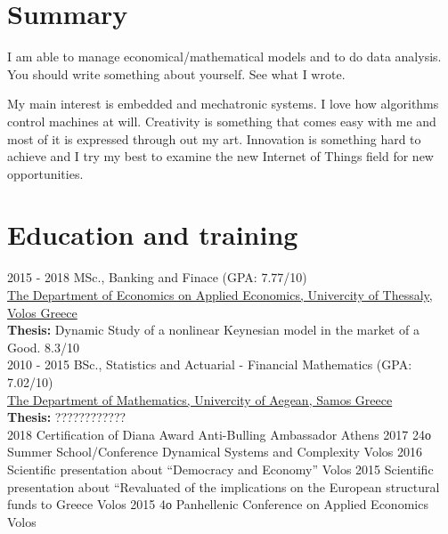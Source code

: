 \documentclass[letterpaper]{engineer_cv} %
\begin{document}
	\makeprofile %


	\section{Summary}

        I am able to manage economical/mathematical models and to do data analysis. You should write something about yourself. See what I wrote.

	My main interest is embedded and mechatronic systems. I love how algorithms control machines at will. Creativity is something that comes easy with me and most of it is expressed through out my art. Innovation is something hard to achieve and I try my best to examine the new Internet of Things field for new opportunities.


	\section{Education and training}

	\begin{longList} %
		\longListItem
			{2015 - 2018}
			{}
			{MSc., Banking and Finace \textnormal{(GPA: 7.77/10)}}
			{\\\href{https://www.econ.uth.gr/}{The Department of Economics on Applied Economics, Univercity of Thessaly, Volos Greece}\\{{\bf Thesis:} Dynamic Study of a nonlinear Keynesian model in the market of a Good. 8.3/10}}
			{}
			{}
			\\
		\longListItem
			{2010 - 2015}
			{}
			{BSc., Statistics and Actuarial - Financial Mathematics \textnormal{(GPA: 7.02/10)}}
			{\\\href{https://www.math.aegean.gr/}{The Department of Mathematics, Univercity of Aegean, Samos Greece}\\{{\bf Thesis:} ????????????}}
			{}
			{}
			\\
		\longListItem
			{2018}
			{}
			{Certification of Diana Award Anti-Bulling Ambassador}
			{Athens}
			{}
			{}
		\longListItem
			{2017}
			{}
			{24ο Summer School/Conference Dynamical Systems and Complexity}
			{Volos}
			{}
			{}
		\longListItem
			{2016}
			{}
			{Scientific presentation about “Democracy and Economy”}
			{Volos}
			{}
			{}
		\longListItem
			{2015}
			{}
			{Scientific presentation about “Revaluated of the implications on the European structural funds to Greece}
			{Volos}
			{}
			{}
		\longListItem
			{2015}
			{}
			{4ο Panhellenic Conference on Applied Economics}
			{Volos}
			{}
			{}
	\end{longList}
\end{document}
